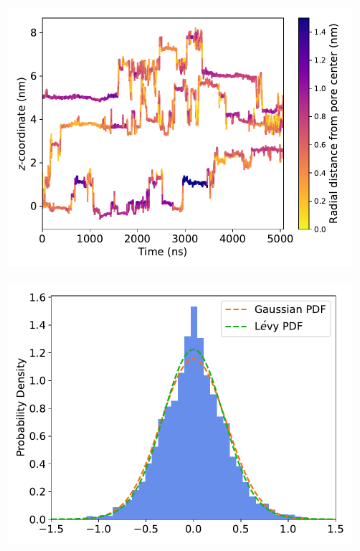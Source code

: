\documentclass[12pt]{article}
\begin{document}
  \begin{figure}
  \centering
  \begin{subfigure}{0.45\textwidth}
  \includegraphics[width=\textwidth]{URE_trajectories.pdf}
  \caption{}\label{fig:solute_trajectories}
  \end{subfigure}
  \begin{subfigure}{0.45\textwidth}
  \includegraphics[width=\textwidth]{gaussian_levy_comparison_anomalous_GCL.pdf}
  \caption{}\label{fig:hop_distribution_comparison}
  \end{subfigure}

\end{figure}
\end{document}

